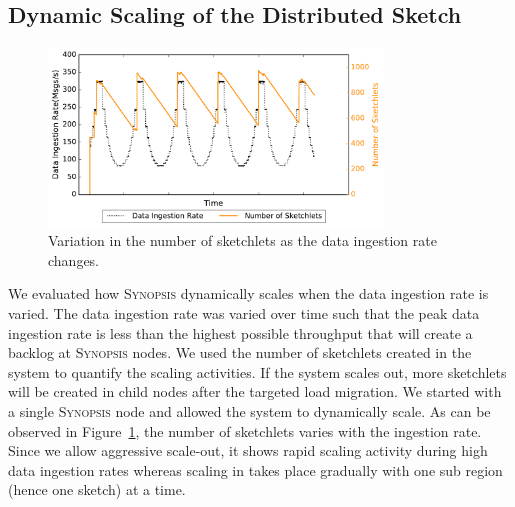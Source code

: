 \subsection{Dynamic Scaling of the Distributed Sketch}
\begin{figure}[h!]
    \centerline{\includegraphics[width=3.5in]{figures/dyn-scaling.pdf}}
    \caption{Variation in the number of sketchlets as the data ingestion rate changes.}
    \label{fig:dyn-scaling}
\end{figure}
We evaluated how \textsc{Synopsis} dynamically scales when the data ingestion rate is varied.
The data ingestion rate was varied over time such that the peak data ingestion rate is less than the highest possible throughput that will create a backlog at \textsc{Synopsis} nodes.
We used the number of sketchlets created in the system to quantify the scaling activities.
If the system scales out, more sketchlets will be created in child nodes after the targeted load migration.
We started with a single \textsc{Synopsis} node and allowed the system to dynamically scale.
As can be observed in Figure~\ref{fig:dyn-scaling}, the number of sketchlets varies with the ingestion rate.
Since we allow aggressive scale-out, it shows rapid scaling activity during high data ingestion rates whereas scaling in takes place gradually with one sub region (hence one sketch) at a time.

